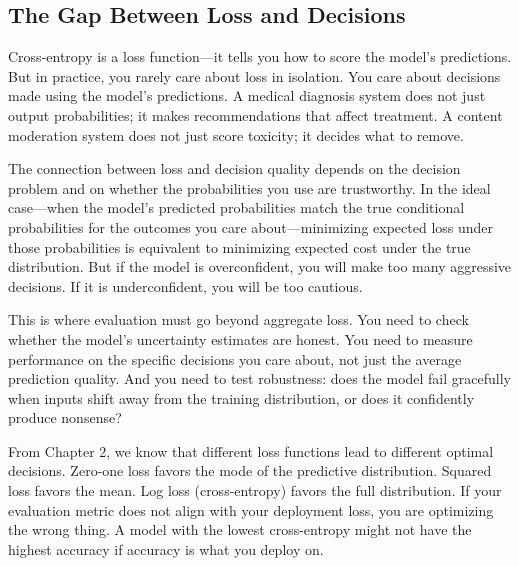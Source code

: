 \vspace{1.5em}

\subsection{The Gap Between Loss and Decisions}

Cross-entropy is a loss function---it tells you how to score the model's predictions. But in practice, you rarely care about loss in isolation. You care about decisions made using the model's predictions. A medical diagnosis system does not just output probabilities; it makes recommendations that affect treatment. A content moderation system does not just score toxicity; it decides what to remove.

\vspace{0.3cm}

The connection between loss and decision quality depends on the decision problem and on whether the probabilities you use are trustworthy. In the ideal case---when the model's predicted probabilities match the true conditional probabilities for the outcomes you care about---minimizing expected loss under those probabilities is equivalent to minimizing expected cost under the true distribution. But if the model is overconfident, you will make too many aggressive decisions. If it is underconfident, you will be too cautious.

\vspace{0.3cm}

This is where evaluation must go beyond aggregate loss. You need to check whether the model's uncertainty estimates are honest. You need to measure performance on the specific decisions you care about, not just the average prediction quality. And you need to test robustness: does the model fail gracefully when inputs shift away from the training distribution, or does it confidently produce nonsense?

\vspace{0.3cm}

From Chapter 2, we know that different loss functions lead to different optimal decisions. Zero-one loss favors the mode of the predictive distribution. Squared loss favors the mean. Log loss (cross-entropy) favors the full distribution. If your evaluation metric does not align with your deployment loss, you are optimizing the wrong thing. A model with the lowest cross-entropy might not have the highest accuracy if accuracy is what you deploy on.

\vspace{1em}

